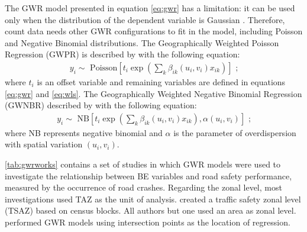 The GWR model presented in equation \ref{eq:gwr} has a limitation: it can be used only when the distribution of the dependent variable is Gaussian \cite{DaSilva2013a}. Therefore, count data needs other GWR configurations to fit in the model, including Poisson and Negative Binomial distributions. The Geographically Weighted Poisson Regression (GWPR) is described by \textcite{Obelheiro2020,Nakaya2005a} with the following equation: \begin{align}
    y_i \sim \mbox{ Poisson} \left[t_i \exp \left(\sum_k \beta_{ik} \left( u_{i}, v_{i} \right) x_{ik} \right) \right] \mbox{ ;}
\end{align} where $t_i$ is an offset variable and remaining variables are defined in equations \ref{eq:gwr} and \ref{eq:wls}. The Geographically Weighted Negative Binomial Regression (GWNBR) described by \textcite{DaSilva2013a} with the following equation: \begin{align}
    y_i \sim \mbox{ NB} \left[t_i \exp \left( \sum_k \beta_{ik} \left( u_{i}, v_{i} \right) x_{ik} \right), \alpha \left( u_{i}, v_{i}\right) \right] \mbox{ ;}
\end{align} where NB represents negative binomial and $\alpha$ is the parameter of overdispersion with spatial variation $\left(u_i, v_i\right)$. 

\autoref{tab:gwrworks} contains a set of studies in which GWR models were used to investigate the relationship between BE variables and road safety performance, measured by the occurrence of road crashes. Regarding the zonal level, most investigations used TAZ as the unit of analysis. \textcite{Obelheiro2020} created a traffic safety zonal level (TSAZ) based on census blocks. All authors but one used an area as zonal level. \textcite{Arvin2019} performed GWR models using intersection points as the location of regression. 

